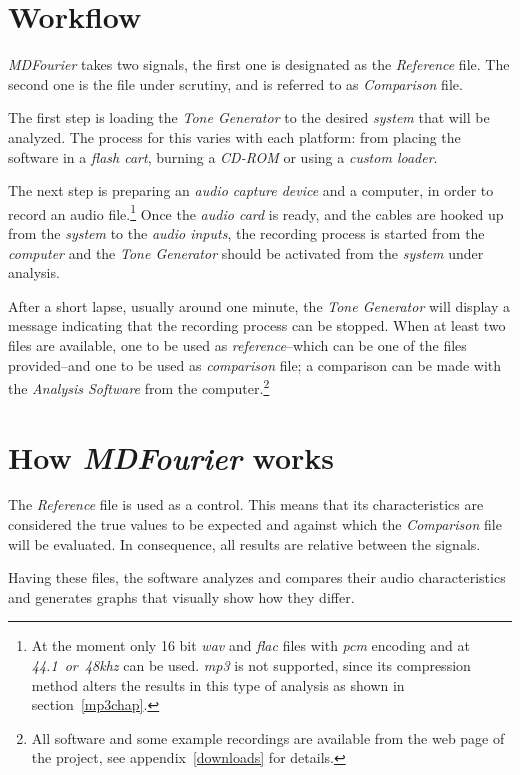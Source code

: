 \documentclass[10pt,a4paper]{report}
\newcommand{\ac}[1]{\textit{\mbox{\acrshort{#1}}}}
\newcommand{\khz}[1]{\textit{\mbox{#1\acrshort{khz}}}}
\begin{document}
\section{Workflow}

\textit{MDFourier} takes two signals, the first one is designated as the \textit{Reference} file. The second one is the file under scrutiny, and is referred to as \textit{Comparison} file. 

The first step is loading the \textit{Tone Generator} to the desired \textit{system} that will be analyzed. The process for this varies with each platform: from placing the software in a \textit{flash cart}, burning a \textit{CD-ROM} or using a \textit{custom loader}.

The next step is preparing an \textit{audio capture device} and a computer, in order to record an audio file.\footnote{At the moment only 16 bit \ac{wav} and \ac{flac} files with \ac{pcm} encoding and at \khz{44.1 or 48} can be used. \ac{mp3} is not supported, since its compression method alters the results in this type of analysis as shown in section~\ref{mp3chap}.} Once the \textit{audio card} is ready, and the cables are hooked up from the \textit{system} to the \textit{audio inputs}, the recording process is started from the \textit{computer} and the \textit{Tone Generator} should be activated from the \textit{system} under analysis.

After a short lapse, usually around one minute, the \textit{Tone Generator} will display a message indicating that the recording process can be stopped. When at least two files are available, one to be used as \textit{reference}--which can be one of the files provided--and one to be used as \textit{comparison} file; a comparison can be made with the \textit{Analysis Software} from the computer.\footnote{All software and some example recordings are available from the web page of the project, see appendix~\ref{downloads} for details.}

\section{How \textit{MDFourier} works}

The \textit{Reference} file is used as a control. This means that its characteristics are considered the true values to be expected and against which the \textit{Comparison} file will be evaluated. In consequence, all results are relative between the signals.

Having these files, the software analyzes and compares their audio characteristics and generates graphs that visually show how they differ.
\end{document}
